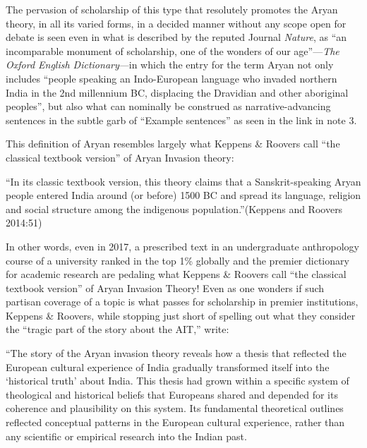 The pervasion of scholarship of this type that resolutely promotes the Aryan theory, in all its varied forms, in a decided manner without any scope open for debate is seen even in what is described by the reputed Journal \textit{Nature}, as “an incomparable monument of scholarship, one of the wonders of our age”—\textit{The Oxford English Dictionary}—in which the entry for the term Aryan not only includes “people speaking an Indo-European language who invaded northern India in the 2nd millennium BC, displacing the Dravidian and other aboriginal peoples”, but also what can nominally be construed as narrative-advancing sentences in the subtle garb of “Example sentences” as seen in the link in note 3.

\vskip 4pt

This definition of Aryan resembles largely what Keppens \& Roovers call “the classical textbook version” of Aryan Invasion theory:

\vskip 4pt

\begin{myquote}
“In its classic textbook version, this theory claims that a Sanskrit-speaking Aryan people entered India around (or before) 1500 BC and spread its language, religion and social structure among the indigenous population.”\hfill (Keppens and Roovers 2014:51)
\end{myquote}

\vskip 4pt

In other words, even in 2017, a prescribed text in an undergraduate anthropology course of a university ranked in the top 1\% globally and the premier dictionary for academic research are pedaling what Keppens \& Roovers call “the classical textbook version” of Aryan Invasion Theory! Even as one wonders if such partisan coverage of a topic is what passes for scholarship in premier institutions, Keppens \& Roovers, while stopping just short of spelling out what they consider the “tragic part of the story about the AIT,” write:

\begin{myquote}
“The story of the Aryan invasion theory reveals how a thesis that reflected the European cultural experience of India gradually transformed itself into the ‘historical truth’ about India. This thesis had grown within a specific system of theological and historical beliefs that Europeans shared and depended for its coherence and plausibility on this system. Its fundamental theoretical outlines reflected conceptual patterns in the European cultural experience, rather than any scientific or empirical research into the Indian past.
\end{myquote}

